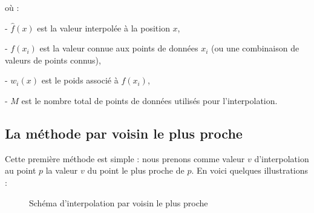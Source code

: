 où :

- \(\hat{f}(x)\) est la valeur interpolée à la position \(x\),

\vspace{-0,2cm}

- \(f(x_i)\) est la valeur connue aux points de données \(x_i\) (ou une combinaison de valeurs de points connus),

\vspace{-0,2cm}

- \(w_i(x)\) est le poids associé à \(f(x_i)\),

\vspace{-0,2cm}

- \(M\) est le nombre total de points de données utilisés pour l'interpolation.




\subsection{La méthode par voisin le plus proche}
Cette première méthode est simple : nous prenons comme valeur \( v \) d'interpolation au point \( p \) la valeur \( v \) du point le plus proche de \( p \).
En voici quelques illustrations :


\begin{figure}[H]
    \centering
    \caption{Schéma d'interpolation par voisin le plus proche}
    \label{fig:interpolation_voisin}
\end{figure}

